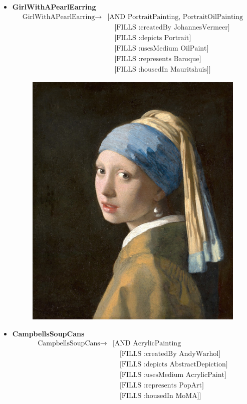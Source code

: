 \begin{itemize}
\begin{figure}[H]
        \end{figure}
      \pagebreak
      \item \textbf{GirlWithAPearlEarring}
        \begin{align*}
          \text{GirlWithAPearlEarring} \to& \text{[AND PortraitPainting, PortraitOilPainting}\\
          &\quad\text{[FILLS :createdBy JohannesVermeer]}\\
          &\quad\text{[FILLS :depicts Portrait]}\\
          &\quad\text{[FILLS :usesMedium OilPaint]}\\
          &\quad\text{[FILLS :represents Baroque]}\\
          &\quad\text{[FILLS :housedIn Mauritshuis]]}
        \end{align*}
        \begin{figure}[H]
          \centering
          \includegraphics[width=0.35\linewidth]{images/girlwithpearlearring.jpg}
        \end{figure}
      \pagebreak
      \item \textbf{CampbellsSoupCans}
        \begin{align*}
          \text{CampbellsSoupCans} \to& \text{[AND AcrylicPainting}\\
          &\quad\text{[FILLS :createdBy AndyWarhol]}\\
          &\quad\text{[FILLS :depicts AbstractDepiction]}\\
          &\quad\text{[FILLS :usesMedium AcrylicPaint]}\\
          &\quad\text{[FILLS :represents PopArt]}\\
          &\quad\text{[FILLS :housedIn MoMA]]}
        \end{align*}
        \begin{figure}[H]
          \centering

\end{figure}
\end{itemize}
